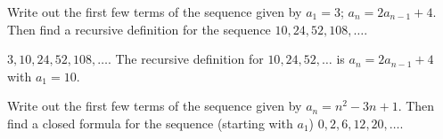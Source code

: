 \begin{questions}

	\begin{answer}
	\end{answer}
	
	
	


\question Write out the first few terms of the sequence given by $a_1 = 3$; $a_n = 2a_{n-1} + 4$.  Then find a recursive definition for the sequence $10, 24, 52, 108, \ldots$.

	\begin{answer}
		$3, 10, 24, 52, 108,\ldots$.  The recursive definition for $10, 24, 52, \ldots$ is $a_n = 2a_{n-1} + 4$ with $a_1 = 10$.
	\end{answer}
	
	
	


\question Write out the first few terms of the sequence given by $a_n = n^2 - 3n + 1$.  Then find a closed formula for the sequence (starting with $a_1$) $0, 2, 6, 12, 20, \ldots$.


\end{questions}
